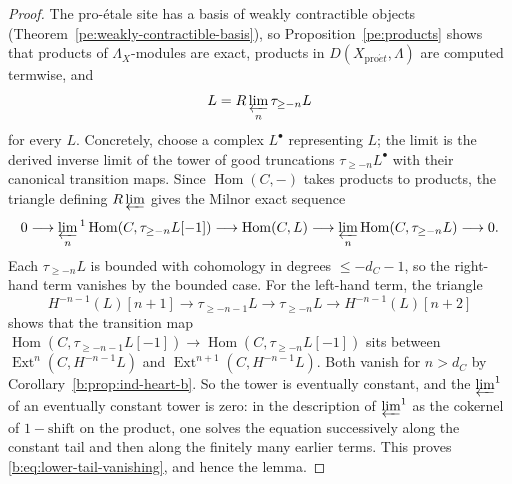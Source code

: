 \documentclass[11pt,a4paper]{article}
\numberwithin{equation}{section}
\theoremstyle{definition}
\theoremstyle{remark}
\newcommand{\D}{D}
\newcommand{\proet}{\mathrm{pro}\acute{e}t}
\newcommand{\Hom}{\operatorname{Hom}}
\newcommand{\Ext}{\operatorname{Ext}}
\begin{document}
\begin{proof}
The pro-\'etale site has a basis of weakly contractible objects
(Theorem~\ref{pe:weakly-contractible-basis}), so
Proposition~\ref{pe:products} shows that products of $\Lambda_X$-modules are
exact, products in $\D(X_{\proet},\Lambda)$ are computed termwise, and
\[
 L=R\varprojlim_n\tau_{\geq-n}L
\]
for every $L$. Concretely, choose a complex $L^\bullet$ representing $L$;
the limit is the derived inverse limit of the tower of good truncations
$\tau_{\geq-n}L^\bullet$ with their canonical transition maps. Since $\Hom(C,-)$ takes
products to products, the triangle defining $R\varprojlim$ gives the
Milnor exact sequence
\[
 0\longrightarrow\varprojlim_n{}^1
       \Hom(C,\tau_{\geq-n}L[-1])
 \longrightarrow\Hom(C,L)
 \longrightarrow\varprojlim_n\Hom(C,\tau_{\geq-n}L)
 \longrightarrow0.
\]
Each $\tau_{\geq-n}L$ is bounded with cohomology in degrees $\leq-d_C-1$,
so the right-hand term vanishes by the bounded case. For the left-hand
term, the triangle
\[
 H^{-n-1}(L)[n+1]\longrightarrow \tau_{\geq-n-1}L
 \longrightarrow \tau_{\geq-n}L\longrightarrow H^{-n-1}(L)[n+2]
\]
shows that the transition map
$\Hom(C,\tau_{\geq-n-1}L[-1])\to\Hom(C,\tau_{\geq-n}L[-1])$ sits between
$\Ext^{n}(C,H^{-n-1}L)$ and $\Ext^{n+1}(C,H^{-n-1}L)$. Both vanish for
$n>d_C$ by Corollary~\ref{b:prop:ind-heart-b}. So the tower is eventually
constant, and the $\varprojlim^1$ of an eventually constant tower is zero:
in the description of $\varprojlim^1$ as the cokernel of $1-\mathrm{shift}$
on the product, one solves the equation successively along the constant
tail and then along the finitely many earlier terms. This proves
\eqref{b:eq:lower-tail-vanishing}, and hence the lemma.
\end{proof}
\end{document}
